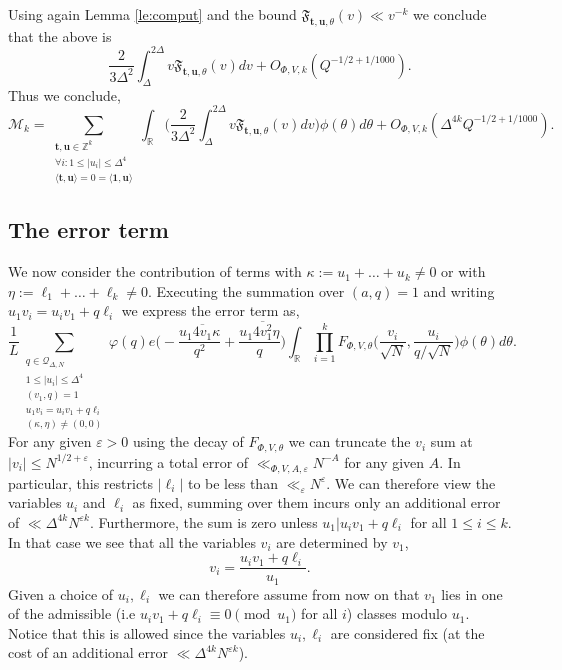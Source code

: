 \documentclass[12pt,reqno]{amsart}
\theoremstyle{plain}
\numberwithin{equation}{section}
\numberwithin{figure}{section}
\theoremstyle{plain}
\theoremstyle{definition}
\theoremstyle{remark}
\begin{document}
Using again Lemma \ref{le:comput} and the bound $\mathfrak{F}_{\boldsymbol{t}, \boldsymbol{u}, \theta}(v) \ll v^{-k}$ we conclude that the above is 
$$
\frac{2}{3 \Delta^2} \int_{\Delta}^{2 \Delta} v \mathfrak{F}_{\boldsymbol{t}, \boldsymbol{u}, \theta}(v) dv + O_{\Phi, V, k}(Q^{-1/2 + 1/1000}). 
$$
Thus we conclude, 
$$
\mathcal{M}_{k} = \sum_{\substack{\boldsymbol{t}, \boldsymbol{u} \in \mathbb{Z}^k \\ \forall i : 1 \leq |u_i| \leq \Delta^4 \\ \langle \boldsymbol{t}, \boldsymbol{u} \rangle = 0 = \langle \boldsymbol{1}, \boldsymbol{u} \rangle }} \int_{\mathbb{R}} \Big ( \frac{2}{3 \Delta^2} \int_{\Delta}^{2 \Delta} v \mathfrak{F}_{\boldsymbol{t}, \boldsymbol{u}, \theta} (v) dv \Big )  \phi(\theta) d \theta   + O_{\Phi, V, k}(\Delta^{4k} Q^{-1/2 + 1/1000}).
$$

\subsection{The error term}

We now consider the contribution of terms with 
$\kappa := u_1 + \ldots + u_k \neq 0$ or with 
$\eta := \ell_1 + \ldots + \ell_k \neq 0$. 
Executing the summation over $(a,q) = 1$ 
and writing $u_1 v_i = u_i v_1 + q \ell_i$ we express 
the error term as,
 \begin{equation}\label{eq: error term first form}
\frac{1}{L} 
\sum_{\substack{q \in 
\mathcal{Q}_{\Delta, N} 
\\ 1 \leq |u_i| \leq 
\Delta^{4} 
\\ (v_1 , q) = 1
\\ u_1 v_i = u_i v_1 + q \ell_i 
\\ (\kappa , \eta) \neq (0, 0)}} 
\varphi(q)
e \Big ( - \frac{u_1 \overline{4 v_1} 
\kappa}{q^2} + \frac{u_1 
\overline{4 v_1^2} \eta}{q} \Big ) 
\int_{\mathbb{R}} \prod_{i = 1}^{k}
F_{\Phi, V, \theta} \Big ( \frac{v_i}{\sqrt{N}}, \frac{u_i}{q / \sqrt{N}} \Big ) \phi(\theta) 
d \theta. 
 \end{equation}
 For any given $\varepsilon > 0$ using the decay of $F_{\Phi, V, \theta}$ we can 
 truncate the $v_i$ sum at $|v_i| \leq N^{1/2 + \varepsilon}$, incurring a total error of $\ll_{\Phi, V, A, \varepsilon} N^{-A}$ for any given $A$.
 In particular, this restricts $|\ell_i|$ to be less than $\ll_{\varepsilon} N^{\varepsilon}$.  
 We can therefore view the variables $u_i$ and $\ell_i$ as fixed, summing over them incurs only an additional error of $\ll \Delta^{4 k} N^{\varepsilon k}$. Furthermore, the sum is zero unless
 $u_1 | u_i v_1 + q \ell_i$ for all $1 \leq i \leq k$. In that case we see that all the variables $v_i$ are determined by $v_1$, 
 $$
 v_i = \frac{u_i v_1 + q \ell_i}{u_1}.
 $$
 Given a choice of $u_i, \ell_i$ we can therefore assume from now on that $v_1$ lies in one of the admissible (i.e $u_i v_1 + q \ell_i \equiv 0 \pmod{u_1}$ for all $i$) classes modulo $u_1$. Notice that this is allowed since the variables $u_i, \ell_i$ are considered fix (at the cost of an additional error $\ll \Delta^{4k } N^{\varepsilon k}$). 
\end{document}
